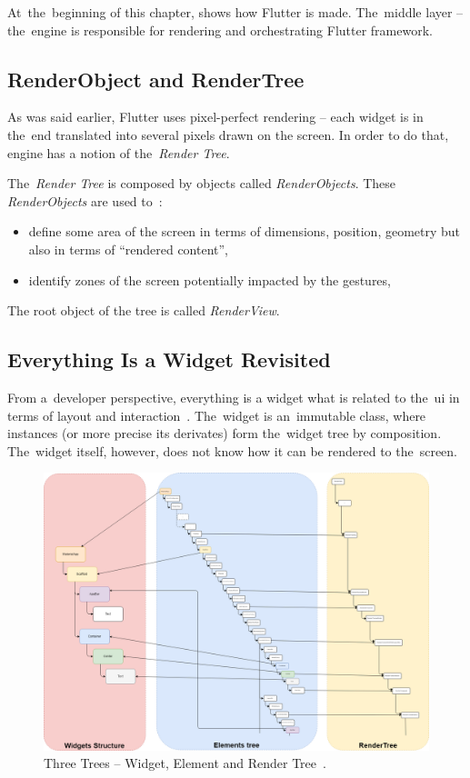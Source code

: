 At~the~beginning of this chapter,  shows how Flutter is made. The~middle layer -- the~engine is responsible for rendering and orchestrating Flutter framework. 
\subsection{RenderObject and RenderTree}
As was said earlier, Flutter uses pixel-perfect rendering -- each widget is in the~end translated into several pixels drawn on the screen. In order to do that, engine has a notion of the~\textit{Render Tree}.

The~\textit{Render Tree} is composed by objects called \textit{RenderObjects}. These \textit{RenderObjects} are used to~\cite{didier-internals}:
\begin{itemize}
    \item define some area of the screen in terms of dimensions, position, geometry but also in terms of ``rendered content'',
    \item identify zones of the screen potentially impacted by the gestures,
\end{itemize}
The root object of the tree is called \textit{RenderView}.
\subsection{Everything Is a Widget Revisited}
From a~developer perspective, everything is a widget what is related to the~\gls{ui} in terms of layout and interaction~\cite{didier-internals}. The~widget is an~immutable class, where instances (or more precise its derivates) form the~widget tree by composition. The~widget itself, however, does not know how it can be rendered to the~screen. 

\begin{figure}[ht]
    \centering
    \includegraphics[width=\linewidth]{img/flutter/internals_3_trees.png}
    \caption{Three Trees -- Widget, Element and Render Tree~\cite{didier-internals}.}
    \label{fig:flutter-internal-3-trees}
\end{figure}

